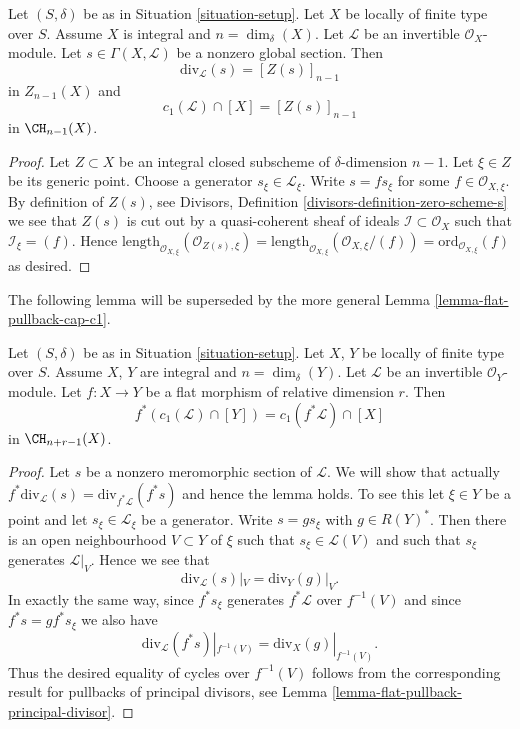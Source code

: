 \begin{lemma}
\label{lemma-compute-c1}
Let $(S, \delta)$ be as in Situation \ref{situation-setup}.
Let $X$ be locally of finite type over $S$. Assume $X$ is
integral and $n = \dim_\delta(X)$.
Let $\mathcal{L}$ be an invertible $\mathcal{O}_X$-module.
Let $s \in \Gamma(X, \mathcal{L})$ be a nonzero global section.
Then
$$
\text{div}_\mathcal{L}(s) = [Z(s)]_{n - 1}
$$
in $Z_{n - 1}(X)$ and
$$
c_1(\mathcal{L}) \cap [X] = [Z(s)]_{n - 1}
$$
in $\CH_{n - 1}(X)$.
\end{lemma}

\begin{proof}
Let $Z \subset X$ be an integral closed subscheme of
$\delta$-dimension $n - 1$. Let $\xi \in Z$ be its generic
point. Choose a generator $s_\xi \in \mathcal{L}_\xi$.
Write $s = fs_\xi$ for some $f \in \mathcal{O}_{X, \xi}$.
By definition of $Z(s)$, see
Divisors, Definition \ref{divisors-definition-zero-scheme-s}
we see that $Z(s)$ is cut out by a quasi-coherent
sheaf of ideals $\mathcal{I} \subset \mathcal{O}_X$ such
that $\mathcal{I}_\xi = (f)$. Hence
$\text{length}_{\mathcal{O}_{X, \xi}}(\mathcal{O}_{Z(s), \xi})
=
\text{length}_{\mathcal{O}_{X, \xi}}(\mathcal{O}_{X, \xi}/(f))
=
\text{ord}_{\mathcal{O}_{X, \xi}}(f)$ as desired.
\end{proof}

\noindent
The following lemma will be superseded by the more general
Lemma \ref{lemma-flat-pullback-cap-c1}.

\begin{lemma}
\label{lemma-flat-pullback-divisor-invertible-sheaf}
Let $(S, \delta)$ be as in Situation \ref{situation-setup}.
Let $X$, $Y$ be locally of finite type over $S$. Assume $X$, $Y$
are integral and $n = \dim_\delta(Y)$.
Let $\mathcal{L}$ be an invertible $\mathcal{O}_Y$-module.
Let $f : X \to Y$ be a flat morphism of relative dimension $r$. Then
$$
f^*(c_1(\mathcal{L}) \cap [Y]) = c_1(f^*\mathcal{L}) \cap [X]
$$
in $\CH_{n + r - 1}(X)$.
\end{lemma}

\begin{proof}
Let $s$ be a nonzero meromorphic section of $\mathcal{L}$.
We will show that actually
$f^*\text{div}_\mathcal{L}(s) = \text{div}_{f^*\mathcal{L}}(f^*s)$
and hence the lemma holds.
To see this let $\xi \in Y$ be a point and let $s_\xi \in \mathcal{L}_\xi$
be a generator. Write $s = gs_\xi$ with $g \in R(Y)^*$.
Then there is an open neighbourhood $V \subset Y$ of $\xi$
such that $s_\xi \in \mathcal{L}(V)$ and such that $s_\xi$ generates
$\mathcal{L}|_V$. Hence we see that
$$
\text{div}_\mathcal{L}(s)|_V = \text{div}_Y(g)|_V.
$$
In exactly the same way, since $f^*s_\xi$ generates $f^*\mathcal{L}$
over $f^{-1}(V)$ and since $f^*s = g f^*s_\xi$ we also
have
$$
\text{div}_\mathcal{L}(f^*s)|_{f^{-1}(V)}
=
\text{div}_X(g)|_{f^{-1}(V)}.
$$
Thus the desired equality of cycles over $f^{-1}(V)$ follows from the
corresponding result for pullbacks of principal divisors, see
Lemma \ref{lemma-flat-pullback-principal-divisor}.
\end{proof}



